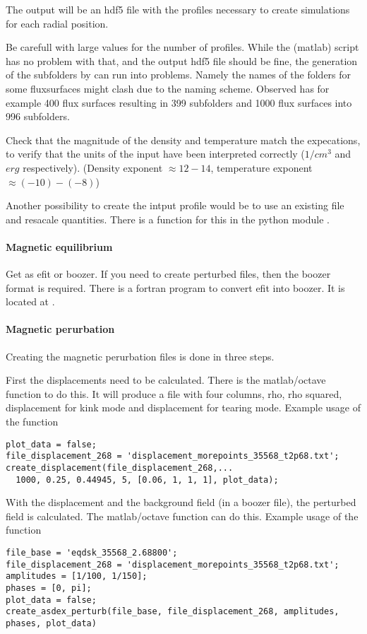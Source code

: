The output will be an hdf5 file with the profiles necessary to create
simulations for each radial position.

Be carefull with large values for the number of profiles. While the
(matlab) script has no problem with that, and the output hdf5 file
should be fine, the generation of the subfolders by \neotwo can run into
problems. Namely the names of the folders for some fluxsurfaces might
clash due to the naming scheme.
Observed has for example 400 flux surfaces resulting in 399 subfolders
and 1000 flux surfaces into 996 subfolders.

Check that the magnitude of the density and temperature match the
expecations, to verify that the units of the input have been interpreted
correctly ($1/cm^3$ and $erg$ respectively). (Density exponent
$\approx 12-14$, temperature exponent $\approx (-10) - (-8)$)

Another possibility to create the intput profile would be to use an
existing file and resacale quantities. There is a function for this in
the python module .

\paragraph{Magnetic equilibrium}
Get as efit or boozer. If you need to create perturbed files, then the
boozer format is required.
There is a fortran program to convert efit into boozer. It is located at
.

\paragraph{Magnetic perurbation}
Creating the magnetic perurbation files is done in three steps.

First the displacements need to be calculated. There is the
matlab/octave function  to do this. It
will produce a file with four columns, rho, rho squared, displacement
for kink mode and displacement for tearing mode. Example usage of the
function
\begin{verbatim}
plot_data = false;
file_displacement_268 = 'displacement_morepoints_35568_t2p68.txt';
create_displacement(file_displacement_268,...
  1000, 0.25, 0.44945, 5, [0.06, 1, 1, 1], plot_data);
\end{verbatim}
With the displacement and the background field (in a boozer file), the
perturbed field is calculated. The matlab/octave function
 can do this. Example usage of the
function
\begin{verbatim}
file_base = 'eqdsk_35568_2.68800';
file_displacement_268 = 'displacement_morepoints_35568_t2p68.txt';
amplitudes = [1/100, 1/150];
phases = [0, pi];
plot_data = false;
create_asdex_perturb(file_base, file_displacement_268, amplitudes, phases, plot_data)
\end{verbatim}

